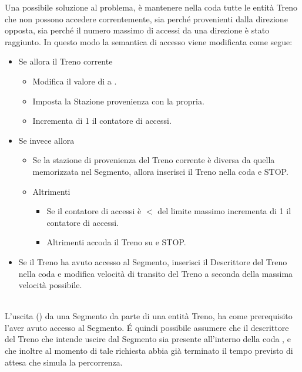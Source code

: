 \begin{description}
			Una possibile soluzione al problema, è mantenere nella coda  tutte le entità Treno che non possono accedere correntemente, sia perché provenienti dalla direzione opposta, sia perché il numero massimo di accessi da una direzione è stato raggiunto. In questo modo la semantica di accesso viene modificata come segue:
				\begin{itemize}
					\item Se  allora il Treno corrente 
						\begin{itemize}
							\item Modifica il valore di  a .
							\item Imposta la Stazione provenienza con la propria.
							\item Incrementa di 1 il contatore di accessi.
						\end{itemize}
					\item Se invece  allora
						\begin{itemize}
							\item Se la stazione di provenienza del Treno corrente è diversa da quella memorizzata nel Segmento, allora inserisci il Treno nella coda  e STOP.
							\item Altrimenti 
								\begin{itemize}
									\item Se il contatore di accessi è $ < $ del limite massimo incrementa di 1 il contatore di accessi.
									\item Altrimenti accoda il Treno su  e STOP.
								\end{itemize}
						\end{itemize}
					\item Se il Treno ha avuto accesso al Segmento, inserisci il Descrittore del Treno nella coda  e modifica velocità di transito del Treno a seconda della massima velocità possibile.
				\end{itemize}
			  
			\item {} \\ 
			
			L'uscita () da una Segmento da parte di una entità Treno, ha come prerequisito l'aver avuto accesso al Segmento. \'E quindi possibile assumere che il descrittore del Treno che intende uscire dal Segmento sia presente all'interno della coda , e che inoltre al momento di tale richiesta abbia già terminato il tempo previsto di attesa che simula la percorrenza.
			

\end{description}
